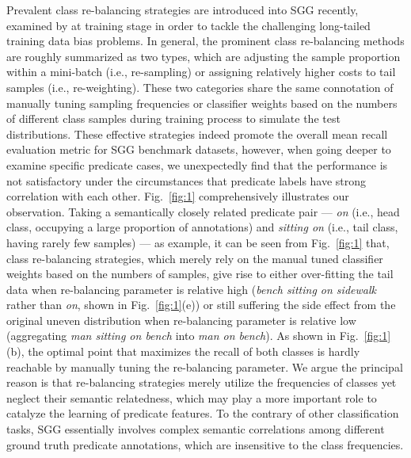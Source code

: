\documentclass[sigconf]{acmart}
\begin{document}
Prevalent class re-balancing strategies are introduced into SGG recently, examined by \citet{tang20} at training stage in order to tackle the challenging long-tailed training data bias problems. In general, the prominent class re-balancing methods are roughly summarized as two types, which are adjusting the sample proportion within a mini-batch (i.e., re-sampling) or assigning relatively higher costs to tail samples (i.e., re-weighting). These two categories share the same connotation of manually tuning sampling frequencies or classifier weights based on the numbers of different class samples during training process to simulate the test distributions. 
These effective strategies indeed promote the overall mean recall evaluation metric for SGG benchmark datasets, however, when  
going deeper to examine specific predicate cases, we unexpectedly find that the performance is not satisfactory under the circumstances that predicate labels have strong correlation with each other.
Fig.~\ref{fig:1} comprehensively illustrates our observation. Taking a semantically closely related predicate pair --- \emph{on} (i.e., head class, occupying a large proportion of annotations) and \emph{sitting on} (i.e., tail class, having rarely few samples) --- as example, it can be seen from Fig.~\ref{fig:1} that, class re-balancing strategies, which merely rely on the manual tuned classifier weights based on the numbers of samples, give rise to either over-fitting the tail data when re-balancing parameter is relative high (\emph{bench sitting on sidewalk} rather than \emph{on}, shown in Fig.~\ref{fig:1}(e)) or still suffering the side effect from the original uneven distribution when re-balancing parameter is relative low (aggregating \emph{man sitting on bench} into \emph{man on bench}).
As shown in Fig.~\ref{fig:1}(b), the optimal point that maximizes the recall of both classes is hardly reachable by manually tuning the re-balancing parameter. We argue the principal reason is that re-balancing strategies merely utilize the frequencies of classes yet neglect their semantic relatedness, which may play a more important role to catalyze the learning of predicate features. To the contrary of other classification tasks, SGG essentially involves complex semantic correlations among different ground truth predicate annotations, which are insensitive to the class frequencies. 
\end{document}
